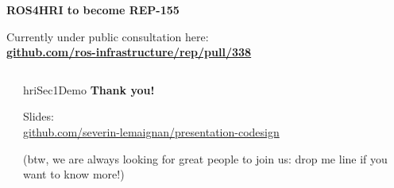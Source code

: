 \documentclass[xcolor=table]{beamer}
\begin{document}
\begin{frame}[plain]{}

    \Large
    \center
    {\bf ROS4HRI to become REP-155}

    \vspace{1em}
    Currently under public consultation here:\\
    {\bf \href{https://github.com/ros-infrastructure/rep/pull/338}{github.com/ros-infrastructure/rep/pull/338}}

\end{frame}




{
    \begin{frame}[plain]

        \begin{columns}
            \begin{column}{0.5\linewidth}
            \end{column}
            \begin{column}{0.5\linewidth}

                \vspace{14em}
                \begin{beamercolorbox}[wd=\linewidth,ht=6ex,dp=0.7ex]{hriSec1Demo}
                    \textbf{Thank you!}

                    \vspace{4em}

                    \footnotesize
                    Slides:\\
                    \href{https://github.com/severin-lemaignan/presentation-codesign}{github.com/severin-lemaignan/presentation-codesign}

                    \vspace{2em}

                    (btw, we are always looking for great people to join us: drop me line if you want to know more!)

                \end{beamercolorbox}
            \end{column}
        \end{columns}
    \end{frame}
}

\appendix
{}
\end{document}
